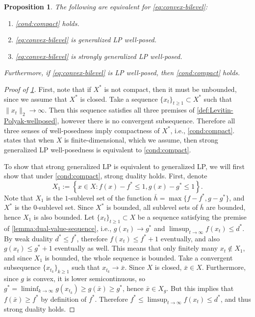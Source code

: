 \documentclass[11pt,oneside]{article}
\theoremstyle{plain}
\newtheorem{proposition}{Proposition}
\theoremstyle{plain}
\theoremstyle{plain}%
\begin{document}
{\begin{proposition}\label{prop:compact-equivalence}
The following are equivalent for \cref{eq:convex-bilevel}:
\begin{enumerate}[label=(\alph*)]
    \item \cref{cond:compact} holds.
    \item \cref{eq:convex-bilevel} is generalized LP well-posed.
    \item \cref{eq:convex-bilevel} is strongly generalized LP well-posed.
\end{enumerate}
Furthermore, if \cref{eq:convex-bilevel} is LP well-posed, then \cref{cond:compact} holds.
\end{proposition}
\begin{proof}[Proof of \cref{prop:compact-equivalence}]
First, note that if $X^*$ is not compact, then it must be unbounded, since we assume that $X^*$ is closed. Take a sequence $\{x_t\}_{t \geq 1} \subset X^*$ such that $\|x_t\|_2 \to \infty$. Then this sequence satisfies all three premises of \cref{def:Levitin-Polyak-wellposed}, however there is no convergent subsequence. Therefore all three senses of well-posedness imply compactness of $X^*$, i.e., \cref{cond:compact}. \citet[Theorem 2.4]{HuangYang2006} states that when $X$ is finite-dimensional, which we assume, then strong generalized LP well-posedness is equivalent to \cref{cond:compact}.


To show that strong generalized LP is equivalent to generalized LP, we will first show that under \cref{cond:compact}, strong duality holds. First, denote
\[ X_1 := \left\{ x \in X : f(x) - f^* \leq 1, g(x) - g^* \leq 1 \right\}. \]
Note that $X_1$ is the $1$-sublevel set of the function $\bar{h} = \max\{f-f^*,g-g^*\}$, and $X^*$ is the $0$-sublevel set. Since $X^*$ is bounded, all sublevel sets of $\bar{h}$ are bounded, hence $X_1$ is also bounded.
Let $\{x_t\}_{t \geq 1} \subset X$ be a sequence satisfying the premise of \cref{lemma:dual-value-sequence}, i.e., $g(x_t) \to g^*$ and $\limsup_{t \to \infty} f(x_t) \leq d^*$. By weak duality $d^* \leq f^*$, therefore $f(x_t) \leq f^* + 1$ eventually, and also $g(x_t) \leq g^* + 1$ eventually as well. This means that only finitely many $x_t \not\in X_1$, and since $X_1$ is bounded, the whole sequence is bounded. Take a convergent subsequence $\{x_{t_k}\}_{k \geq 1}$ such that $x_{t_k} \to \bar{x}$. Since $X$ is closed, $\bar{x} \in X$. Furthermore, since $g$ is convex, it is lower semicontinuous, so $g^* = \liminf_{k \to \infty} g(x_{t_k}) \geq g(\bar{x}) \geq g^*$, hence $\bar{x} \in X_g$. But this implies that $f(\bar{x}) \geq f^*$ by definition of $f^*$. Therefore $f^* \leq \limsup_{t \to \infty} f(x_t) \leq d^*$, and thus strong duality holds.


\end{proof}}
\end{document}
